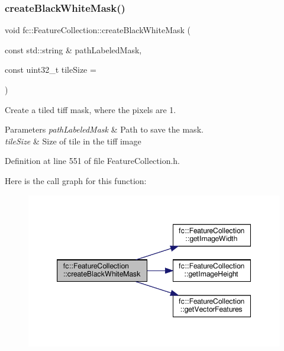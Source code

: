 \subsubsection{\texorpdfstring{create\+Black\+White\+Mask()}{createBlackWhiteMask()}}
{\footnotesize\ttfamily void fc\+::\+Feature\+Collection\+::create\+Black\+White\+Mask (\begin{DoxyParamCaption}\item[{const std\+::string \&}]{path\+Labeled\+Mask,  }\item[{const uint32\+\_\+t}]{tile\+Size = {} }\end{DoxyParamCaption})\hspace{0.3cm}{\ttfamily [inline]}}



Create a tiled tiff mask, where the pixels are 1. 


\begin{DoxyParams}{Parameters}
{\em path\+Labeled\+Mask} & Path to save the mask. \\
\hline
{\em tile\+Size} & Size of tile in the tiff image \\
\hline
\end{DoxyParams}


Definition at line 551 of file Feature\+Collection.\+h.

Here is the call graph for this function\+:
\nopagebreak
\begin{figure}[H]
\begin{center}
\leavevmode
\includegraphics[width=347pt]{d9/d78/classfc_1_1FeatureCollection_a6a3df355558df392bbf54e8734975964_cgraph}
\end{center}
\end{figure}
\mbox{\label{classfc_1_1FeatureCollection_a6cb55ca9179ea92ef2dedf9f25531b77}} 
